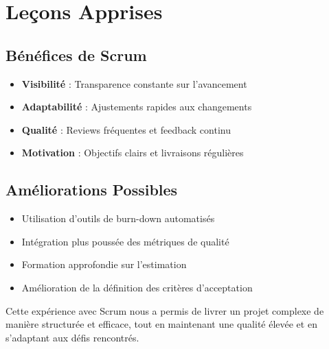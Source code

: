 \section{Leçons Apprises}

\subsection{Bénéfices de Scrum}

\begin{itemize}
    \item \textbf{Visibilité} : Transparence constante sur l'avancement
    \item \textbf{Adaptabilité} : Ajustements rapides aux changements
    \item \textbf{Qualité} : Reviews fréquentes et feedback continu
    \item \textbf{Motivation} : Objectifs clairs et livraisons régulières
\end{itemize}

\subsection{Améliorations Possibles}

\begin{itemize}
    \item Utilisation d'outils de burn-down automatisés
    \item Intégration plus poussée des métriques de qualité
    \item Formation approfondie sur l'estimation
    \item Amélioration de la définition des critères d'acceptation
\end{itemize}

Cette expérience avec Scrum nous a permis de livrer un projet complexe de manière structurée et efficace, tout en maintenant une qualité élevée et en s'adaptant aux défis rencontrés. 
